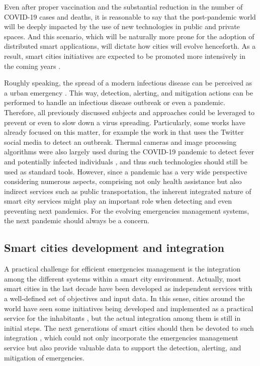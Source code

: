 \begin{refsection}
Even after proper vaccination and the substantial reduction in the number of COVID-19 cases and deaths, it is reasonable to say that the post-pandemic world will be deeply impacted by the use of new technologies in public and private spaces. And this scenario, which will be naturally more prone for the adoption of distributed smart applications, will dictate how cities will evolve henceforth. As a result, smart cities initiatives are expected to be promoted more intensively in the coming years \cite{covidsmartcities6}.

Roughly speaking, the spread of a modern infectious disease can be perceived as a urban emergency \cite{covidsmartcities1}. This way, detection, alerting, and mitigation actions can be performed to handle an infectious disease outbreak or even a pandemic. Therefore, all previously discussed subjects and approaches could be leveraged to prevent or even to slow down a virus spreading. Particularly, some works have already focused on this matter, for example the work in \cite{twitter2} that uses the Twitter social media to detect an outbreak. Thermal cameras and image processing algorithms were also largely used during the COVID-19 pandemic to detect fever and potentially infected individuals \cite{covidsmartcities4}, and thus such technologies should still be used as standard tools. However, since a pandemic has a very wide perspective considering numerous aspects, comprising not only health assistance but also indirect services such as public transportation, the inherent integrated nature of smart city services might play an important role when detecting and even preventing next pandemics. For the evolving emergencies management systems, the next pandemic should always be a concern.

\subsection{Smart cities development and integration}

A practical challenge for efficient emergencies management is the integration among the different systems within a smart city environment. Actually, most smart cities in the last decade have been developed as independent services with a well-defined set of objectives and input data. In this sense, cities around the world have seen some initiatives being developed and implemented as a practical service for the inhabitants \cite{citiestransforming,citiestransforming2}, but the actual integration among them is still in initial steps. The next generations of smart cities should then be devoted to such integration \cite{smartcities3}, which could not only incorporate the emergencies management service but also provide valuable data to support the detection, alerting, and mitigation of emergencies.


\end{refsection}
